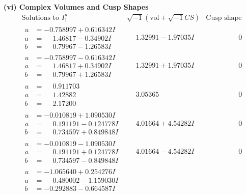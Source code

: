 \documentclass[1p]{elsarticle_modified}
\theoremstyle{definition}
\newcommand{\I}{\sqrt{-1}}
\begin{document}
\newpage\flushleft \textbf{(vi) Complex Volumes and Cusp Shapes}
$$\begin{array}{c|c|c}  
\text{Solutions to }I^u_{1}& \I (\text{vol} + \sqrt{-1}CS) & \text{Cusp shape}\\
 \hline 
\begin{aligned}
u &= -0.758997 + 0.616342 I \\
a &= \phantom{-}1.46817 - 0.34902 I \\
b &= \phantom{-}0.79967 - 1.26583 I\end{aligned}
 & \phantom{-}1.32991 - 1.97035 I & \phantom{-0.000000 } 0 \\ \hline\begin{aligned}
u &= -0.758997 - 0.616342 I \\
a &= \phantom{-}1.46817 + 0.34902 I \\
b &= \phantom{-}0.79967 + 1.26583 I\end{aligned}
 & \phantom{-}1.32991 + 1.97035 I & \phantom{-0.000000 } 0 \\ \hline\begin{aligned}
u &= \phantom{-}0.911703\phantom{ +0.000000I} \\
a &= \phantom{-}1.42882\phantom{ +0.000000I} \\
b &= \phantom{-}2.17200\phantom{ +0.000000I}\end{aligned}
 & \phantom{-}3.05365\phantom{ +0.000000I} & \phantom{-0.000000 } 0 \\ \hline\begin{aligned}
u &= -0.010819 + 1.090530 I \\
a &= \phantom{-}0.191191 - 0.124778 I \\
b &= \phantom{-}0.734597 + 0.849848 I\end{aligned}
 & \phantom{-}4.01664 + 4.54282 I & \phantom{-0.000000 } 0 \\ \hline\begin{aligned}
u &= -0.010819 - 1.090530 I \\
a &= \phantom{-}0.191191 + 0.124778 I \\
b &= \phantom{-}0.734597 - 0.849848 I\end{aligned}
 & \phantom{-}4.01664 - 4.54282 I & \phantom{-0.000000 } 0 \\ \hline\begin{aligned}
u &= -1.065640 + 0.254276 I \\
a &= \phantom{-}0.480002 - 1.159030 I \\
b &= -0.292883 - 0.664587 I\end{aligned}

\end{array}$$
\end{document}
